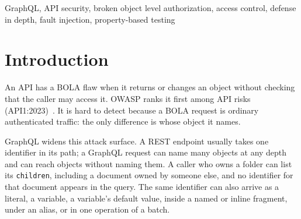 \documentclass[conference]{IEEEtran}
\newcommand{\code}[1]{\texttt{\small #1}}
\begin{document}
\begin{IEEEkeywords}
GraphQL, API security, broken object level authorization, access control, defense in depth, fault injection, property-based testing
\end{IEEEkeywords}

\section{Introduction}

An API has a BOLA flaw when it returns or changes an object without checking that the caller may access it. OWASP ranks it first among API risks (API1:2023)~\cite{owasp2023}. It is hard to detect because a BOLA request is ordinary authenticated traffic: the only difference is whose object it names.

GraphQL widens this attack surface. A REST endpoint usually takes one identifier in its path; a GraphQL request can name many objects at any depth and can reach objects without naming them. A caller who owns a folder can list its \code{children}, including a document owned by someone else, and no identifier for that document appears in the query. The same identifier can also arrive as a literal, a variable, a variable's default value, inside a named or inline fragment, under an alias, or in one operation of a batch.
\end{document}
